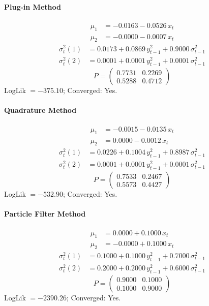 \documentclass[11pt, a4paper]{article}
\begin{document}
\paragraph{Plug-in Method}
\begin{align}
\mu_{1} &= -0.0163 -0.0526\, x_t \\
\mu_{2} &= -0.0000 -0.0007\, x_t
\end{align}
\begin{align}
\sigma^2_{t}(1) &= 0.0173 + 0.0869\, y_{t-1}^2 + 0.9000\, \sigma^2_{t-1} \\
\sigma^2_{t}(2) &= 0.0001 + 0.0001\, y_{t-1}^2 + 0.0001\, \sigma^2_{t-1}
\end{align}
\begin{equation}
P = \begin{pmatrix} 0.7731 & 0.2269 \\ 0.5288 & 0.4712 \end{pmatrix}
\end{equation}
LogLik $= -375.10$; Converged: Yes.

\paragraph{Quadrature Method}
\begin{align}
\mu_{1} &= -0.0015 -0.0135\, x_t \\
\mu_{2} &= 0.0000 -0.0012\, x_t
\end{align}
\begin{align}
\sigma^2_{t}(1) &= 0.0226 + 0.1004\, y_{t-1}^2 + 0.8987\, \sigma^2_{t-1} \\
\sigma^2_{t}(2) &= 0.0001 + 0.0001\, y_{t-1}^2 + 0.0001\, \sigma^2_{t-1}
\end{align}
\begin{equation}
P = \begin{pmatrix} 0.7533 & 0.2467 \\ 0.5573 & 0.4427 \end{pmatrix}
\end{equation}
LogLik $= -532.90$; Converged: Yes.

\paragraph{Particle Filter Method}
\begin{align}
\mu_{1} &= 0.0000 + 0.1000\, x_t \\
\mu_{2} &= -0.0000 + 0.1000\, x_t
\end{align}
\begin{align}
\sigma^2_{t}(1) &= 0.1000 + 0.1000\, y_{t-1}^2 + 0.7000\, \sigma^2_{t-1} \\
\sigma^2_{t}(2) &= 0.2000 + 0.2000\, y_{t-1}^2 + 0.6000\, \sigma^2_{t-1}
\end{align}
\begin{equation}
P = \begin{pmatrix} 0.9000 & 0.1000 \\ 0.1000 & 0.9000 \end{pmatrix}
\end{equation}
LogLik $= -2390.26$; Converged: Yes.
\end{document}
